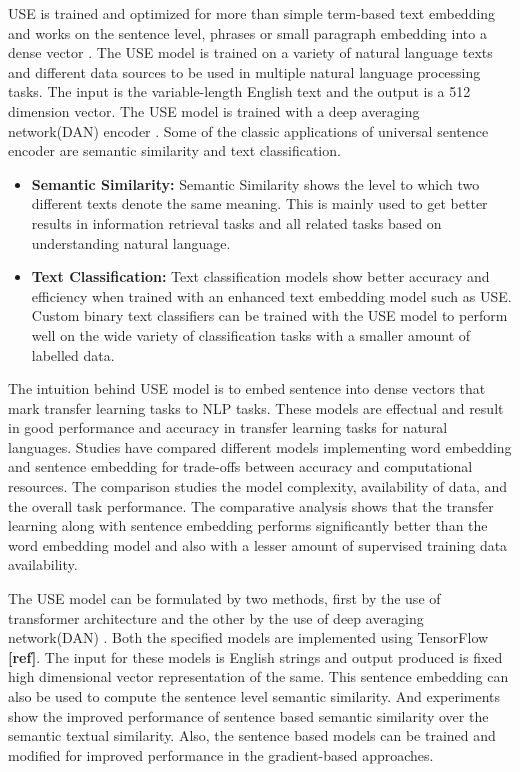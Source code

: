 USE is trained and optimized for more than simple term-based text embedding and works on the sentence level, phrases or small paragraph embedding into a dense vector \cite{RN32}. The USE model is trained on a variety of natural language texts and different data sources to be used in multiple natural language processing tasks. The input is the variable-length English text and the output is a 512 dimension vector. The USE model is trained with a deep averaging network(DAN) encoder \cite{RN32}.
Some of the classic applications of universal sentence encoder are semantic similarity and text classification.
\begin{itemize}
    \item \textbf{Semantic Similarity:} Semantic Similarity shows the level to which two different texts denote the same meaning. This is mainly used to get better results in information retrieval tasks and all related tasks based on understanding natural language. 
    \item \textbf{Text Classification:} Text classification models show better accuracy and efficiency when trained with an enhanced text embedding model such as USE.  Custom binary text classifiers can be trained with the USE model to perform well on the wide variety of classification tasks with a smaller amount of labelled data.
\end{itemize}

The intuition behind USE model is to embed sentence into dense vectors that mark transfer learning tasks to NLP tasks. These models are effectual and result in good performance and accuracy in transfer learning tasks for natural languages. Studies have compared different models implementing word embedding and sentence embedding for trade-offs between accuracy and computational resources. The comparison studies the model complexity, availability of data, and the overall task performance. The comparative analysis shows that the transfer learning along with sentence embedding performs significantly better than the word embedding model and also with a lesser amount of supervised training data availability.

The USE model can be formulated by two methods, first by the use of transformer architecture and the other by the use of deep averaging network(DAN) \cite{RN32}. Both the specified models are implemented using TensorFlow \textbf{[ref]}. The input for these models is English strings and output produced is fixed high dimensional vector representation of the same. This sentence embedding can also be used to compute the sentence level semantic similarity. And experiments show the improved performance of sentence based semantic similarity over the semantic textual similarity. Also, the sentence based models can be trained and modified for improved performance in the gradient-based approaches.

